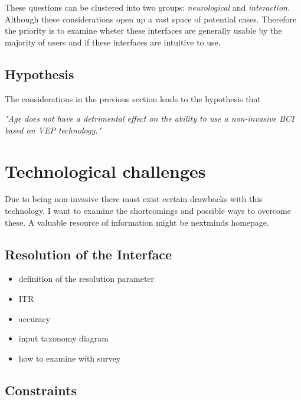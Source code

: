             These questions can be clustered into two groups: \textit{neurological} and \textit{interaction}. Although these considerations open up a vast space of potential cases. Therefore the priority is to examine wheter these interfaces are generally usable by the majority of users and if these interfaces are intuitive to use. 

        \section{Hypothesis}

            The considerations in the previous section leads to the hypothesis that

            \medskip
            \emph{"Age does not have a detrimental effect on the ability to use a non-invasive BCI based on VEP technology."}
            \medskip

    \chapter{Technological challenges}

        Due to being non-invasive there must exist certain drawbacks with this technology. I want to examine the shortcomings and possible ways to overcome these.    
        A valuable resource of information might be nextminds homepage.

        \section{Resolution of the Interface}


            \begin{itemize}
                \item definition of the resolution parameter
                \item ITR
                \item accuracy
                \item input taxonomy diagram
                \item how to examine with survey                                     
            \end{itemize}

        \section{Constraints}

